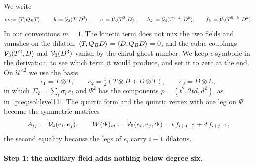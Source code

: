 We write
\begin{equation}
  \label{eq:sol:d5:couplings}
  m
    := \braket{T, Q_B T}_{},
  \qquad
  b
    := \mathcal{V}_{3}(T, D^2),
  \qquad
  c
    := \mathcal{V}_{3}(T^2, D),
  \qquad
  h_k
    := \mathcal{V}_{4}(T^{4 - k}, D^k),
  \qquad
  f_k
    := \mathcal{V}_{5}(T^{5 - k}, D^k).
\end{equation}
In our conventions $m = 1$.
The kinetic term does not mix the two fields and vanishes on the dilaton, $\braket{T, Q_B D}_{} = \braket{D, Q_B D}_{} = 0$, and the cubic couplings $\mathcal{V}_{3}(T^2, D)$ and $\mathcal{V}_{3}(D^3)$ vanish by the chiral ghost number.
We keep $c$ symbolic in the derivation, to see which term it would produce, and set it to zero at the end.
On $\mathcal U^{\wedge 2}$ we use the basis
\begin{equation}
  e_1
    = T \otimes T,
  \qquad
  e_2
    = \tfrac{1}{2} (T \otimes D + D \otimes T),
  \qquad
  e_3
    = D \otimes D,
\end{equation}
in which $\Sigma_2 = \sum_i \sigma_i \, e_i$ and $\Psi^2$ has the components $p = (t^2, 2 t d, d^2)$, as in~\eqref{p:eq:sol:level11}.
The quartic form and the quintic vertex with one leg on $\Psi$ become the symmetric matrices
\begin{equation}
  A_{ij}
    := \mathcal{V}_{4}(e_i, e_j),
  \qquad
  W(\Psi)_{ij}
    := \mathcal{V}_{5}(e_i, e_j, \Psi)
    = t \, f_{i + j - 2} + d \, f_{i + j - 1},
\end{equation}
the second equality because the legs of $e_i$ carry $i - 1$ dilatons.

\paragraph{Step 1: the auxiliary field adds nothing below degree six.}

